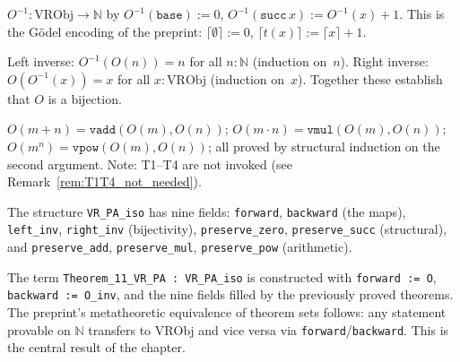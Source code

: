 \begin{definition}
\label{def:O_inv}
\leanok
{}
$O^{-1} : \mathrm{VRObj} \to \mathbb{N}$ by $O^{-1}(\texttt{base}) := 0$,
$O^{-1}(\texttt{succ}\,x) := O^{-1}(x) + 1$.  This is the Gödel
encoding of the preprint: $\lceil\emptyset\rceil := 0$,
$\lceil t(x)\rceil := \lceil x\rceil + 1$.
\end{definition}

\begin{theorem}[Bijectivity of $O$]
\label{thm:O_bij}
\leanok
{}
Left inverse: $O^{-1}(O(n)) = n$ for all $n : \mathbb{N}$ (induction on~$n$).
Right inverse: $O(O^{-1}(x)) = x$ for all $x : \mathrm{VRObj}$
(induction on~$x$).  Together these establish that $O$ is a bijection.
\end{theorem}

\begin{theorem}
\label{thm:O_ops}
\leanok
{}
$O(m + n) = \texttt{vadd}(O(m), O(n))$;
$O(m \cdot n) = \texttt{vmul}(O(m), O(n))$;
$O(m^n) = \texttt{vpow}(O(m), O(n))$;
all proved by structural induction on the second argument.
Note: T1--T4 are not invoked (see Remark~\ref{rem:T1T4_not_needed}).
\end{theorem}

\begin{definition}
\label{def:VR_PA_iso}
\leanok
{}
The structure \texttt{VR\_PA\_iso} has nine fields:
\texttt{forward}, \texttt{backward} (the maps), \texttt{left\_inv},
\texttt{right\_inv} (bijectivity), \texttt{preserve\_zero},
\texttt{preserve\_succ} (structural), and \texttt{preserve\_add},
\texttt{preserve\_mul}, \texttt{preserve\_pow} (arithmetic).
\end{definition}

\begin{theorem}
\label{thm:T11}
\leanok
{}
The term \texttt{Theorem\_11\_VR\_PA : VR\_PA\_iso} is constructed with
\texttt{forward := O}, \texttt{backward := O\_inv}, and the nine fields
filled by the previously proved theorems.  The preprint's metatheoretic
equivalence of theorem sets follows: any statement provable on
$\mathbb{N}$ transfers to $\mathrm{VRObj}$ and vice versa via
\texttt{forward}/\texttt{backward}.  This is the central result of the
chapter.
\end{theorem}


